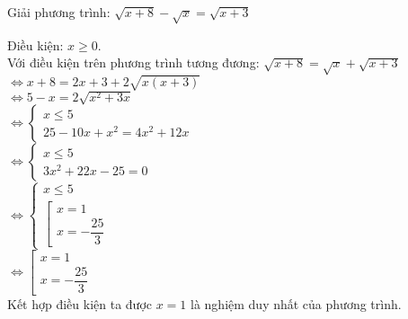 \begin{baitap}
 Giải phương trình: $ \sqrt{x+8 } - \sqrt{x } = \sqrt{x + 3}    $
\begin{loigiai1}
Điều kiện: $ x \geq 0 $. \\
Với điều kiện trên phương trình tương đương: $ \sqrt{x+8 } = \sqrt{x } + \sqrt{x + 3}  $ \\
$ \Leftrightarrow x+8 = 2x +3 + 2 \sqrt{x(x+3 ) } $ \\
$ \Leftrightarrow 5-x = 2 \sqrt{x^2 + 3x } $ \\
$ \Leftrightarrow \begin{cases}
    x \leq 5 \\
    25 -10x + x^2 = 4x^2 + 12x
\end{cases} $ \\
$ \Leftrightarrow \begin{cases}
    x \leq 5 \\
    3x^2 +22x -25 =0
\end{cases} $ \\
$ \Leftrightarrow \begin{cases}
    x \leq 5 \\
    \left[
        \begin{array}{l}
            x =1 \\
            x= -\dfrac{25 }{3 }  
        \end{array}
    \right. 
\end{cases} $ \\
$ \Leftrightarrow \left[
    \begin{array}{l}
        x =1 \\
        x=-\dfrac{25 }{3 }  
    \end{array}
\right. $ \\
Kết hợp điều kiện ta được $x=1$ là nghiệm duy nhất của phương trình.
\end{loigiai1}

\end{baitap}
